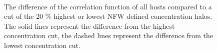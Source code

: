 \documentclass[usenatbib,usegraphicx,letterpaper]{mn2e}
\begin{document}
\begin{figure}
	\centering
	\\
	\caption{The difference of the correlation function of all hosts compared to a cut of the 20 \% highest or lowest NFW defined concentration halos. The solid lines represent the difference from the highest concentration cut, the dashed lines represent the difference from the lowest concentration cut.}
\end{figure}
\end{document}
